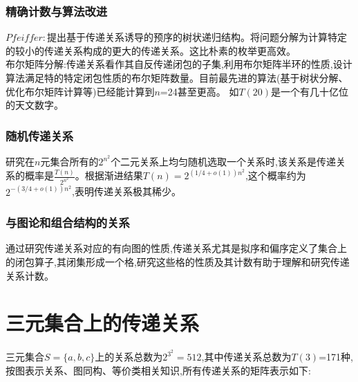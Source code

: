 \documentclass[12pt]{article}
\theoremstyle{definition}
\begin{document}
\subsubsection{精确计数与算法改进}
$Pfeiffer:$提出基于传递关系诱导的预序的树状递归结构。将问题分解为计算特定的较小的传递关系构成的更大的传递关系。这比朴素的枚举更高效。\\
\hspace*{2em}布尔矩阵分解:传递关系看作其自反传递闭包的子集,利用布尔矩阵半环的性质,设计算法满足特的特定闭包性质的布尔矩阵数量。目前最先进的算法(基于树状分解、优化布尔矩阵计算等)已经能计算到$n$=24甚至更高。
如$T(20)$是一个有几十亿位的天文数字。
\subsubsection{随机传递关系}
研究在$n$元集合所有的$2^{n^{2}}$个二元关系上均匀随机选取一个关系时,该关系是传递关系的概率是$\frac{T(n)}{2^{n^{2}}}$。根据渐进结果$T(n)=2^{(1/4+o(1))n^2}$,这个概率约为
$2^{-(3/4+o(1))n^2}$,表明传递关系极其稀少。
\subsubsection{与图论和组合结构的关系}
通过研究传递关系对应的有向图的性质,传递关系尤其是拟序和偏序定义了集合上的闭包算子,其闭集形成一个格,研究这些格的性质及其计数有助于理解和研究传递关系计数。\\

\newpage
\section{三元集合上的传递关系}
三元集合$S=\{a,b,c\}$上的关系总数为$2^{3^2}=512$,其中传递关系总数为$T(3)$=171种,按图表示关系、图同构、等价类相关知识,所有传递关系的矩阵表示如下:\\
\end{document}
